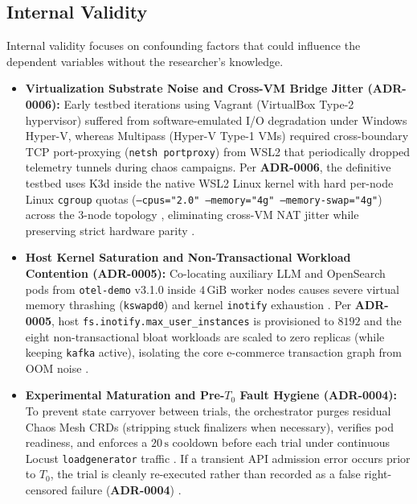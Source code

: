 \subsection{Internal Validity}
Internal validity focuses on confounding factors that could influence the dependent variables without the researcher's knowledge.
\begin{itemize}
    \item \textbf{Virtualization Substrate Noise and Cross-VM Bridge Jitter (ADR-0006):} Early testbed iterations using Vagrant (VirtualBox Type-2 hypervisor) suffered from software-emulated I/O degradation under Windows Hyper-V, whereas Multipass (Hyper-V Type-1 VMs) required cross-boundary TCP port-proxying (\texttt{netsh portproxy}) from WSL2 that periodically dropped telemetry tunnels during chaos campaigns. Per \textbf{ADR-0006}, the definitive testbed uses K3d inside the native WSL2 Linux kernel with hard per-node Linux \texttt{cgroup} quotas (\texttt{--cpus="2.0" --memory="4g" --memory-swap="4g"}) across the 3-node topology \cite{bernstein_2014}, eliminating cross-VM NAT jitter while preserving strict hardware parity \cite{jain_1991}.
    \item \textbf{Host Kernel Saturation and Non-Transactional Workload Contention (ADR-0005):} Co-locating auxiliary LLM and OpenSearch pods from \texttt{otel-demo} v3.1.0 inside $4\,\text{GiB}$ worker nodes causes severe virtual memory thrashing (\texttt{kswapd0}) \cite{denning_1968} and kernel \texttt{inotify} exhaustion \cite{bernstein_2014}. Per \textbf{ADR-0005}, host \texttt{fs.inotify.max\_user\_instances} is provisioned to $8192$ and the eight non-transactional bloat workloads are scaled to zero replicas (while keeping \texttt{kafka} active), isolating the core e-commerce transaction graph from OOM noise \cite{kuria_2024}.
    \item \textbf{Experimental Maturation and Pre-$T_0$ Fault Hygiene (ADR-0004):} To prevent state carryover between trials, the orchestrator purges residual Chaos Mesh CRDs (stripping stuck finalizers when necessary), verifies pod readiness, and enforces a $20\,\text{s}$ cooldown before each trial under continuous Locust \texttt{loadgenerator} traffic \cite{basiri_2016}. If a transient API admission error occurs prior to $T_0$, the trial is cleanly re-executed rather than recorded as a false right-censored failure (\textbf{ADR-0004}) \cite{sjoberg_2007}.
\end{itemize}

